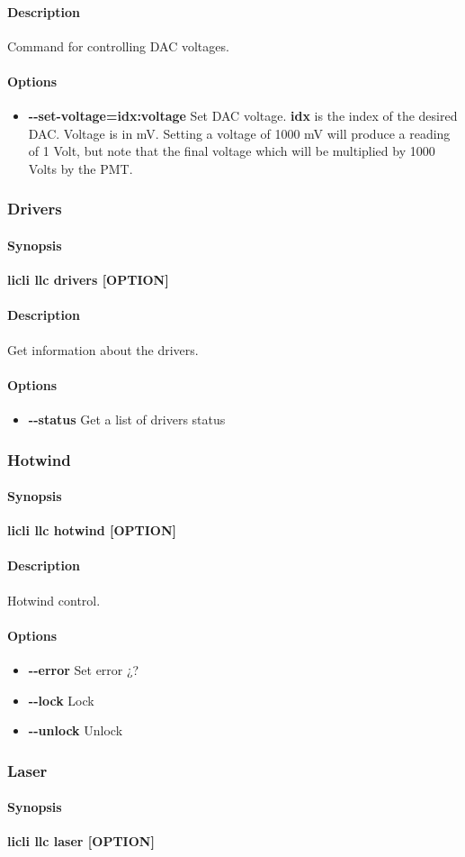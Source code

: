 \documentclass[letterpaper, 10 pt]{article}
\newcommand{\cmdsection}[1]{\paragraph{#1}\mbox{}\par}
\begin{document}
\cmdsection{Description} Command for controlling DAC voltages.\\
\cmdsection{Options}
\begin{itemize}
	\item[] \textbf{-{}-set-voltage=idx:voltage} Set DAC voltage. \textbf{idx} is the index of the desired DAC. Voltage is in mV. Setting a voltage of 1000 mV will produce a reading of 1 Volt, but note that the final voltage which will be multiplied by 1000 Volts by the PMT. 
\end{itemize}
\addtolength{\leftskip}{-10 mm}

\subsubsection{Drivers}
\cmdsection{Synopsis} \textbf{licli llc drivers [OPTION] \\}

\cmdsection{Description} Get information about the drivers.\\
\cmdsection{Options}
\begin{itemize}
	\item[] \textbf{-{}-status} Get a list of drivers status
\end{itemize}

\subsubsection{Hotwind}
\cmdsection{Synopsis} \textbf{licli llc hotwind [OPTION]}\\

\cmdsection{Description} Hotwind control.\\
\cmdsection{Options}
\begin{itemize}
	\item[] \textbf{-{}-error} Set error ¿?
	\item[] \textbf{-{}-lock} Lock
	\item[] \textbf{-{}-unlock} Unlock
\end{itemize}
\subsubsection{Laser}
\cmdsection{Synopsis} \textbf{licli llc laser [OPTION]}\\
\end{document}
